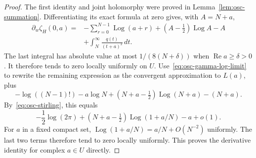 \begin{proof}
The first identity and joint holomorphy were proved in
Lemma~\ref{lem:osc-summation}. Differentiating its exact formula at zero
gives, with \(A=N+a\),
\begin{align*}
 \partial_w\zeta_H(0,a)
 ={}&-\sum_{r=0}^{N-1}\operatorname{Log}(a+r)
       +(A-\tfrac12)\operatorname{Log}A-A\\
    &+\int_N^\infty\frac{q(t)}{(t+a)^2}\,dt.
\end{align*}
The last integral has absolute value at most \(1/(8(N+\delta))\)
when \(\operatorname{Re}a\geq\delta>0\).
It therefore tends to zero locally uniformly on \(U\).
Use~\eqref{eq:osc-gamma-log-limit} to rewrite the remaining expression
as the convergent approximation to \(L(a)\), plus
\[
 -\log((N-1)!)-a\log N
 +(N+a-\tfrac12)\operatorname{Log}(N+a)-(N+a).
\]
By~\eqref{eq:osc-stirling}, this equals
\[
 -\frac12\log(2\pi)
 +(N+a-\tfrac12)\operatorname{Log}(1+a/N)-a+o(1).
\]
For \(a\) in a fixed compact set,
\(\operatorname{Log}(1+a/N)=a/N+O(N^{-2})\) uniformly.
The last two terms therefore tend to zero locally uniformly.
This proves the derivative identity for complex \(a\in U\) directly.
\end{proof}
